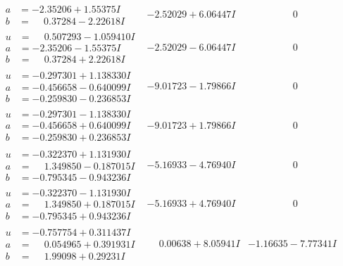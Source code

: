 \documentclass[1p]{elsarticle_modified}
\theoremstyle{definition}
\begin{document}
$$\begin{array}{c|c|c}
\begin{aligned}
a &= -2.35206 + 1.55375 I \\
b &= \phantom{-}0.37284 - 2.22618 I\end{aligned}
 & -2.52029 + 6.06447 I & \phantom{-0.000000 } 0 \\ \hline\begin{aligned}
u &= \phantom{-}0.507293 - 1.059410 I \\
a &= -2.35206 - 1.55375 I \\
b &= \phantom{-}0.37284 + 2.22618 I\end{aligned}
 & -2.52029 - 6.06447 I & \phantom{-0.000000 } 0 \\ \hline\begin{aligned}
u &= -0.297301 + 1.138330 I \\
a &= -0.456658 - 0.640099 I \\
b &= -0.259830 - 0.236853 I\end{aligned}
 & -9.01723 - 1.79866 I & \phantom{-0.000000 } 0 \\ \hline\begin{aligned}
u &= -0.297301 - 1.138330 I \\
a &= -0.456658 + 0.640099 I \\
b &= -0.259830 + 0.236853 I\end{aligned}
 & -9.01723 + 1.79866 I & \phantom{-0.000000 } 0 \\ \hline\begin{aligned}
u &= -0.322370 + 1.131930 I \\
a &= \phantom{-}1.349850 - 0.187015 I \\
b &= -0.795345 - 0.943236 I\end{aligned}
 & -5.16933 - 4.76940 I & \phantom{-0.000000 } 0 \\ \hline\begin{aligned}
u &= -0.322370 - 1.131930 I \\
a &= \phantom{-}1.349850 + 0.187015 I \\
b &= -0.795345 + 0.943236 I\end{aligned}
 & -5.16933 + 4.76940 I & \phantom{-0.000000 } 0 \\ \hline\begin{aligned}
u &= -0.757754 + 0.311437 I \\
a &= \phantom{-}0.054965 + 0.391931 I \\
b &= \phantom{-}1.99098 + 0.29231 I\end{aligned}
 & \phantom{-}0.00638 + 8.05941 I & -1.16635 - 7.77341 I \\ \hline\begin{aligned}

\end{aligned}
\end{array}$$
\end{document}
